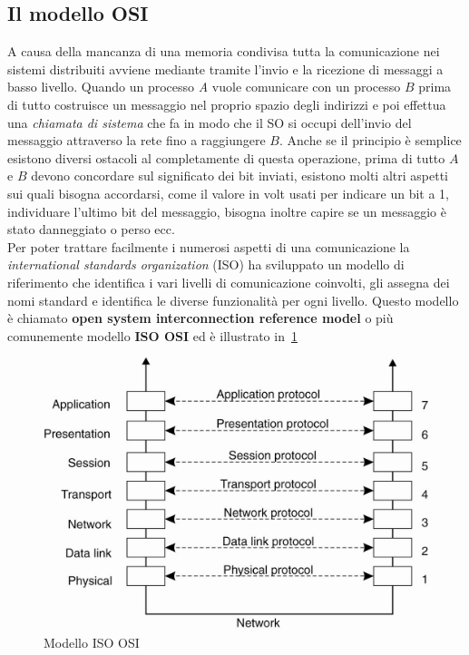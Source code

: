 \subsection{Il modello OSI}
A causa della mancanza di una memoria condivisa tutta la comunicazione nei sistemi distribuiti avviene mediante tramite l'invio e la ricezione di messaggi a basso livello. Quando un processo \emph{A} vuole comunicare con un processo $B$ prima di tutto costruisce un messaggio nel proprio spazio degli indirizzi e poi effettua una \emph{chiamata di sistema} che fa in modo che il SO si occupi dell'invio del messaggio attraverso la rete fino a raggiungere $B$. Anche se il principio è semplice esistono diversi ostacoli al completamente di questa operazione, prima di tutto $A$ e $B$ devono concordare sul significato dei bit inviati, esistono molti altri aspetti sui quali bisogna accordarsi, come il valore in volt usati per indicare un bit a 1, individuare l'ultimo bit del messaggio, bisogna inoltre capire se un messaggio è stato danneggiato o perso ecc.\\
Per poter trattare facilmente i numerosi aspetti di una comunicazione la \emph{international standards organization} (ISO) ha sviluppato un modello di riferimento che identifica i vari livelli di comunicazione coinvolti, gli assegna dei nomi standard e identifica le diverse funzionalità per ogni livello. Questo modello è chiamato \textbf{open system interconnection reference model} o più comunemente modello \textbf{ISO OSI} ed è illustrato in \figurename\,\ref{img:osi}
\begin{figure}[htb]
\centering
\includegraphics[scale=0.4]{img/osi.png}
\caption{Modello ISO OSI}\label{img:osi}
\end{figure}
